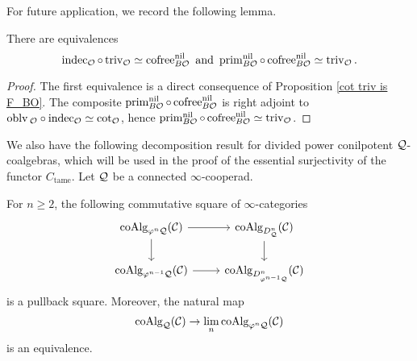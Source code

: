 For future application, we record the following lemma.
\begin{lemma}
\cite[(3.4) and (3.5)]{Francis-Gaitsgory}
\label{CE of Trivial is cofree}
There are equivalences
$$
\operatorname{indec}_{{\mathcal{O}}}\circ\operatorname{triv}_{{\mathcal{O}}} \simeq \operatorname{cofree}^{\operatorname{nil}}_{B{\mathcal{O}}}  \text{ and } 
\operatorname{prim}_{B{\mathcal{O}}}^{\operatorname{nil}} \circ \operatorname{cofree}^{\operatorname{nil}}_{B{\mathcal{O}}} \simeq \operatorname{triv}_{{\mathcal{O}}}.
$$
\end{lemma}
\begin{proof}
    The first equivalence is a direct consequence of Proposition \ref{cot triv is F_BO}.
    The composite $\operatorname{prim}_{B{\mathcal{O}}}^{\operatorname{nil}} \circ \operatorname{cofree}^{\operatorname{nil}}_{B{\mathcal{O}}}$ is right adjoint to
    $\operatorname{oblv}{_{{\mathcal{O}}}\circ \operatorname{indec}_{{\mathcal{O}}}}\simeq \cot_{{\mathcal{O}}}$, hence $\operatorname{prim}_{B{\mathcal{O}}}^{\operatorname{nil}} \circ \operatorname{cofree}^{\operatorname{nil}}_{B{\mathcal{O}}} \simeq \operatorname{triv}_{{\mathcal{O}}}$.
\end{proof}



We also have the following decomposition result for divided power conilpotent ${\mathcal{Q}}$-coalgebras, which will be used in the proof of the essential surjectivity of the functor $C_{\operatorname{tame}}$. Let ${\mathcal{Q}}$ be a connected $\infty$-cooperad.
\begin{proposition}
\cite[Theorem 4.12]{Heuts_Koszul}
\label{inductive construction of coalgebras}
    For $n\geq 2$, the following commutative square of $\infty$-categories 
\[
\begin{tikzcd}
	\coAlg_{\varphi^n \CQ}(\CC) & 
	\coAlg_{D^n_{\CQ}}(\CC)\\
	\coAlg_{\varphi^{n-1} \CQ}(\CC) & 
	\coAlg_{D^n_{\varphi^{n-1}\CQ}}(\CC)
	\arrow[from=1-1, to= 1-2]
	\arrow[from=1-1, to=2-1]
	\arrow[from=1-2, to=2-2]
	\arrow[from=2-1, to= 2-2]
\end{tikzcd}
\]
is a pullback square. Moreover, the natural map
$$
\operatorname{coAlg}_{{\mathcal{Q}}}({\mathcal{C}}) \to \lim_n \operatorname{coAlg}_{\varphi^n{\mathcal{Q}}}({\mathcal{C}})
$$
is an equivalence.
\end{proposition}

